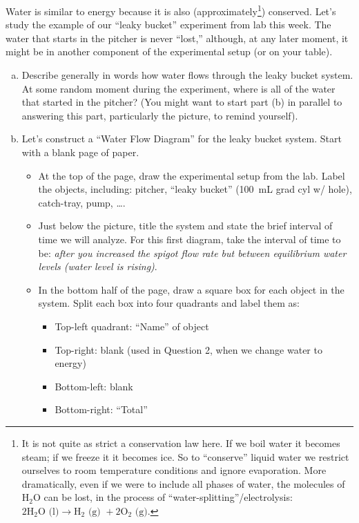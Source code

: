 \documentclass[12pt]{article}
\begin{document}
\begin{enumerate}
Water is similar to energy because it is also (approximately\footnote{It is not quite as strict a conservation law here.  If we boil water it becomes steam; if we freeze it it becomes ice. So to ``conserve'' liquid water we restrict ourselves to room temperature conditions and ignore evaporation.  More dramatically, even if we were to include all phases of water, the molecules of $\text{H}_2\text{O}$ can be lost, in the process of ``water-splitting''/electrolysis: $2\text{H}_2\text{O} \text{ (l)} \rightarrow \text{H}_2 \text{ (g) } + 2\text{O}_2 \text{ (g)}$.}) conserved.  Let's study the example of our ``leaky bucket'' experiment from lab this week. The water that starts in the pitcher is never ``lost,'' although, at any later moment, it might be in another component of the experimental setup (or on your table).
	\begin{enumerate}[(a)]
	\item Describe generally in words how water flows through the leaky bucket system.  At some random moment during the experiment, where is all of the water that started in the pitcher?  (You might want to start part (b) in parallel to answering this part, particularly the picture, to remind yourself).
	\item Let's construct a ``Water Flow Diagram'' for the leaky bucket system.    Start with a blank page of paper.  
		\begin{itemize}
		\item At the top of the page, draw the experimental setup from the lab.  Label the objects, including: pitcher, ``leaky bucket'' (100~mL grad cyl w/ hole), catch-tray, pump, \ldots.
		\item Just below the picture, title the system and state the brief interval of time we will analyze.  For this first diagram, take the interval of time to be: {\em after you increased the spigot flow rate but between equilibrium water levels (water level is rising)}.
		\item In the bottom half of the page, draw a square box for each object in the system. Split each box into four quadrants and label them as:
			\begin{itemize}
			\item Top-left quadrant: ``Name'' of object
			\item Top-right:  blank (used in Question 2, when we change water to energy)
			\item Bottom-left: blank
			\item Bottom-right: ``Total''
			\end{itemize}

\end{itemize}
\end{enumerate}
\end{enumerate}
\end{document}
